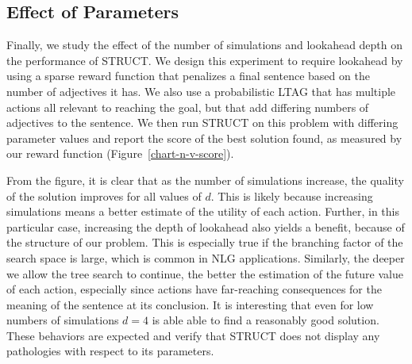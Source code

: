 \subsection{Effect of Parameters}
Finally, we study the effect of the number of simulations and
lookahead depth on the performance of STRUCT. We design this
experiment to require lookahead by using  a sparse
reward function that penalizes a final sentence based on the number of
adjectives it has. We also use a probabilistic LTAG that has multiple
actions all relevant to reaching the goal, but that add differing
numbers of adjectives to the sentence. We then run STRUCT on this
problem with differing parameter values and report the score of the
best solution found, as measured by our reward function
(Figure~\ref{chart-n-v-score}). 

From the figure, it is clear that as the number of simulations
increase, the quality of the solution improves for all values of $d$.
This is likely because increasing simulations means a better estimate
of the utility of each action. Further, in this particular case,
increasing the depth of lookahead also yields a benefit, because of
the structure of our problem. This is especially true if the branching
factor of the search space is large, which is common in NLG
applications.  Similarly, the deeper we allow the tree search to continue, the
better the estimation of the future value of each action,
especially since actions have far-reaching consequences for the
meaning of the sentence at its conclusion. 
It is interesting that even for low numbers of
simulations $d=4$ is able able to find a reasonably good
solution. These behaviors are expected and verify 
that STRUCT does not display any pathologies with respect to its parameters.